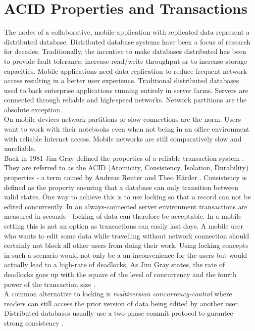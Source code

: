 \section{ACID Properties and Transactions}
The nodes of a collaborative, mobile application with replicated data represent a distributed database.
Distributed database systems have been a focus of research for decades.
Traditionally, the incentive to make databases distributed has been to provide fault tolerance, increase read/write throughput or to increase storage capacities.
Mobile applications need data replication to reduce frequent network access resulting in a better user experience.
Traditional distributed databases used to back enterprise applications running entirely in server farms.
Servers are connected through reliable and high-speed networks.
Network partitions are the absolute exception.\\
On mobile devices network partitions or slow connections are the norm.
Users want to work with their notebooks even when not being in an office environment with reliable Internet access.
Mobile networks are still comparatively slow and unreliable.\\
Back in 1981 Jim Gray defined the properties of a reliable transaction system \cite{Gray:1981wi}.
They are referred to as the ACID (Atomicity, Consistency, Isolation, Durability) properties - a term coined by Andreas Reuter and Theo Härder \cite{haerder1983principles}.
Consistency is defined as the property ensuring that a database can only transition between valid states.
One way to achieve this is to use locking so that a record can not be edited concurrently.
In an always-connected server environment transactions are measured in seconds - locking of data can therefore be acceptable.
In a mobile setting this is not an option as transactions can easily last days.
A mobile user who wants to edit some data while travelling without network connection should certainly not block all other users from doing their work.
Using locking concepts in such a scenario would not only be a an inconvenience for the users but would actually lead to a high-rate of deadlocks.
As Jim Gray states, the rate of deadlocks goes up with the square of the level of concurrency and the fourth power of the transaction size \cite{gray1981strawman}.\\
A common alternative to locking is \emph{multiversion concurrency-control} where readers can still access the prior version of data being edited by another user.
Distributed databases usually use a two-phase commit protocol to gurantee strong consistency \cite{bernstein1987concurrency}.
